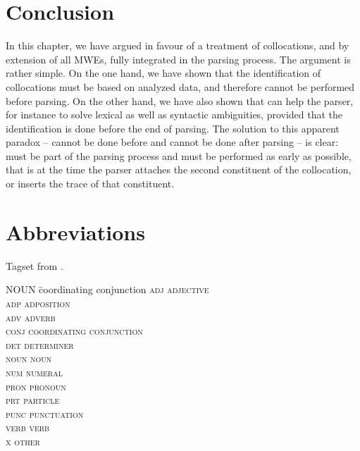 \documentclass[output=paper]{langsci/langscibook}
\begin{document}
\section{Conclusion}
\label{fou:sec7}
In this chapter, we have argued in favour of a treatment of collocations, and by extension of all MWEs, fully integrated in the parsing process. The argument is rather simple. On the one hand, we have shown that the identification of collocations must be based on analyzed data, and therefore cannot be performed before parsing. On the other hand, we have also shown that  can help the parser, for instance to solve lexical as well as syntactic ambiguities, provided that the identification is done before the end of parsing. The solution to this apparent paradox --  cannot be done before and cannot be done after parsing -- is clear:  must be part of the parsing process and must be performed as early as possible, that is at the time the parser attaches the second constituent of the collocation, or inserts the trace of that constituent. 

%
% 

\section*{Abbreviations}
Tagset from \cite{petrov12}.
\begin{multicols}{2}
\begin{tabbing}
NOUN \hspace{1em} \= coordinating conjunction\kill
    \scshape adj \> adjective \\
    \scshape adp \> adposition \\
    \scshape adv \> adverb \\
    \scshape conj \> coordinating conjunction \\
    \scshape det \> determiner \\
    \scshape noun \> noun \\
    \scshape num \> numeral \\
    \scshape pron \> pronoun \\
    \scshape prt \> particle     \\
    \scshape punc \> punctuation \\
    \scshape verb \> verb \\
    \scshape x \> other
\end{tabbing}
\end{multicols}

{\sloppy\printbibliography[heading=subbibliography,notkeyword=this]}
\end{document}
